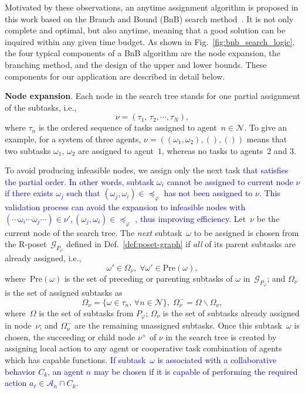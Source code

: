 Motivated by these observations, an anytime assignment
algorithm is proposed in this work based on the Branch and Bound (BnB) search
method~\citep{morrison2016branch}.
It is not only complete and optimal, but also anytime, meaning that a good
solution can be inquired within any given time budget.
As shown in Fig.~\ref{fig:bnb_search_logic},
the four typical components of a BnB
algorithm are the node expansion, the branching method,
and the design of the upper and lower bounds.
These components for our application are described in detail below.


\textbf{Node expansion}.
Each node in the search tree stands for one partial assignment of the
subtasks, i.e.,
\begin{equation}\label{eq:node}
\nu = (\tau_1,\,\tau_2,\cdots,\tau_N),
\end{equation}
where $\tau_n$ is the ordered sequence of tasks assigned to agent~$n\in \mathcal{N}$.
To give an example, for a system of three agents,
$\nu=((\omega_1,\omega_2),(),())$ means that two subtasks
$\omega_1,\, \omega_2$ are assigned to agent~$1$,
whereas no tasks to agents~$2$ and $3$.


To avoid producing infeasible nodes, we assign only the next task
\textcolor{blue}{that satisfies the partial order.}
\textcolor{blue}{In other words, subtask $\omega_i$ cannot 
be assigned to current node $\nu$ if there exists $\omega_j$
such that $(\omega_j,\omega_i)\in\preceq_\varphi$ has not been assigned to $\nu$.
This validation process can avoid the expansion to infeasible nodes with $(\cdots\omega_i\cdots\omega_j\cdots)\in\nu', (\omega_j,\omega_i)\in\preceq_\varphi$
, thus improving  efficiency.} 
 Let~$\nu$ be the current node of the search tree.
The \emph{next} subtask~$\omega$ to be assigned is chosen from the
R-poset~$\mathcal{G}_{P_\varphi}$ defined in Def.~\ref{def:poset-graph}
if \emph{all} of its parent subtasks are already assigned, i.e.,
\begin{equation}\label{eq:next-task}
\omega' \in \Omega_\nu, \; \forall \omega' \in \text{Pre}(\omega),
\end{equation}
where~$\text{Pre}(\omega)$ is the set of preceding or parenting subtasks of $\omega$ in~$\mathcal{G}_{P_\varphi}$;
and $\Omega_\nu$ is the set of assigned subtasks as
\begin{equation}\label{eq:node-tasks}
\Omega_{\nu}=\{\omega\in\tau_n,\,\forall n\in \mathcal{N}\},
\;\Omega^-_{\nu} = \Omega\backslash \Omega_{\nu},
\end{equation}
where~$\Omega$ is the set of subtasks from $P_\varphi$;
$\Omega_{\nu}$ is the set of subtasks already assigned in node~$\nu$;
and $\Omega^-_{\nu}$ are the remaining unassigned subtasks. Once this
subtask~$\omega$ is chosen, the succeeding or child node $\nu^+$
of $\nu$ in the search tree is created by assigning local action to any agent or
cooperative task combination of agents which has capable functions. 
\textcolor{blue}{If subtask~$\omega$ is associated with a collaborative
  behavior $C_k$, an agent $n$ may be chosen if it is capable of performing
the required action $a_\ell\in\mathcal{A}_n\cap C_k$.}

